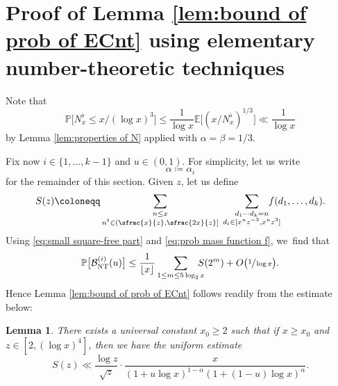 \documentclass[10pt]{amsart}
\newcommand{\PP}{\mathbb{P}}
\newcommand{\EE}{\mathbb{E}}
\newcommand{\floor}[1]{\left\lfloor #1 \right\rfloor}
\newcommand{\bg}{\big}
\newcommand{\Bnt}{\mathcal{B}_{\mathrm{NT}}}
\theoremstyle{plain}
\newtheorem{lem}[cor]{Lemma}
\theoremstyle{definition}
\begin{document}
\section{Proof of Lemma \ref{lem:bound of prob of ECnt} using elementary number-theoretic techniques}\label{sec:boundary event NT}

Note that
\begin{equation}
\label{eq:small square-free part}
\PP\bg[N_x^\flat\le x/(\log x)^3\bg] \le \frac{1}{\log x} \EE\bg[(x/N_x^\flat)^{1/3}\bg] \ll \frac{1}{\log x}
\end{equation}
by Lemma \ref{lem:properties of N} applied with $\alpha=\beta=1/3$.

Fix now $i\in\{1,\dots,k-1\}$ and $u\in(0,1)$. For simplicity, let us write
\[
\alpha\coloneqq \alpha_i
\]
for the remainder of this section. Given $z$, let us define
\[
S(z)\coloneqq \sum_{\substack{n\le x \\ n^\flat \in(\sfrac{x}{z},\sfrac{2x}{z}]}}\; \sum_{\substack{d_1\cdots d_k = n \\ d_i\in[x^uz^{-3}, x^uz^3] }}\hspace*{-5mm} f(d_1,\dots,d_k).
\]
Using \eqref{eq:small square-free part} and \eqref{eq:prob mass function f}, we~find that
\begin{equation}
\label{eq:bounding Bnt 1}
\PP\bg[\Bnt^{(i)}(u)\bg] \le \frac{1}{\floor{x}} \sum_{1\le m\le 5\log_2x}\hspace*{-3mm} S(2^m) + O\bg(\sfrac{1}{\log x}\bg).
\end{equation}
Hence Lemma \ref{lem:bound of prob of ECnt} follows readily from the estimate below:

\begin{lem}
There exists a universal constant $x_0\ge2$ such that if $x\ge x_0$ and $z\in[2,(\log x)^4]$, then we have the uniform estimate
\[
S(z) \ll \frac{\log z}{\sqrt{z}} \cdot \frac{x}{(1+ u\log x)^{1-\alpha}(1+(1-u)\log x)^{\alpha}}.
\]
\end{lem}
\end{document}

